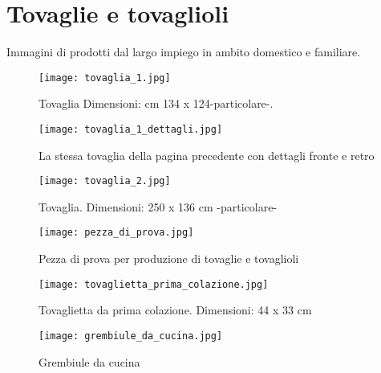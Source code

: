\chapter[]{Tovaglie e tovaglioli}
\graphicspath{ {./images/chapter6/} }

Immagini di prodotti dal largo impiego in ambito domestico e familiare.

\newpage

\begin{figure}[h]
	\centering
		\texttt{[image: tovaglia\_1.jpg]}
	\caption{Tovaglia Dimensioni: cm 134 x 124-particolare-.}
	\label{fig:tovaglia_1}
\end{figure}

\newpage

\begin{figure}[h]
	\centering
		\texttt{[image: tovaglia\_1\_dettagli.jpg]}
	\caption{La stessa tovaglia della pagina precedente con dettagli fronte e retro}
	\label{fig:tovaglia_1_dettagli}
\end{figure}

\newpage

\begin{figure}[h]
	\centering
		\texttt{[image: tovaglia\_2.jpg]}
	\caption{Tovaglia. Dimensioni: 250 x 136 cm -particolare-}
	\label{fig:tovaglia_2}
\end{figure}

\newpage

\begin{figure}[h]
	\centering
		\texttt{[image: pezza\_di\_prova.jpg]}
	\caption{Pezza di prova per produzione di tovaglie e tovaglioli}
	\label{fig:pezza_di_prova}
\end{figure}

\newpage

\begin{figure}[h]
	\centering
		\texttt{[image: tovaglietta\_prima\_colazione.jpg]}
	\caption{Tovaglietta da prima colazione. Dimensioni: 44 x 33 cm}
	\label{fig:tovaglietta_prima_colazione}
\end{figure}

\newpage

\begin{figure}[h]
	\centering
		\texttt{[image: grembiule\_da\_cucina.jpg]}
	\caption{Grembiule da cucina}
	\label{fig:grembiule_da_cucina}
\end{figure}

\clearpage



